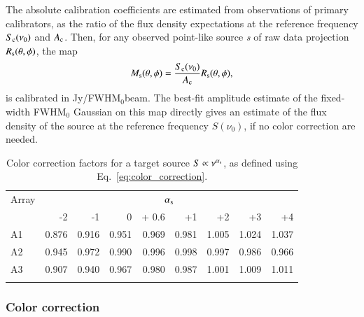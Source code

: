 The absolute calibration coefficients are estimated from observations
of primary calibrators, as the ratio of
the flux density expectations at the reference frequency
$S_{\rm{c}}(\nu_0)$ and $A_{\rm{c}}$. Then, for any observed point-like source
{\sl s} of raw data projection $R_{\rm{s}}(\theta,\phi)$, the map
\begin{equation}
  M_{\rm{s}}(\theta, \phi) = \frac{S_{\rm{c}} (\nu_{0})}{A_{\rm{c}}}
  R_{\rm{s}}(\theta,\phi),
  \label{eq:pointsourcephot}
\end{equation}
is calibrated in Jy/FWHM$_{0}$beam. {\lp The best-fit amplitude estimate
of the fixed-width FWHM$_{0}$ Gaussian on this map directly gives an
estimate of the flux density of the source at the reference
frequency $S(\nu_{0})$, if no color correction are needed.}

\begin{table}[!thbp]
\caption{Color correction factors for a target source  $S \propto \nu^{\alpha_{\rm{s}}}$, as defined using Eq.~\ref{eq:color_correction}.}
\label{tab:mod}
\centering 
\begin{tabular}{lrrrrrrrr}
\hline\hline
\noalign{\smallskip}
Array     & \multicolumn{8}{c}{$\alpha_{\rm{s}}$} \\
\noalign{\smallskip}
\hline
\noalign{\smallskip}
         &  -2 &  -1    &    0  & + 0.6 & +1  &  +2  & +3 & +4  \\       
\noalign{\smallskip}
\hline
\noalign{\smallskip}
          A1   & 0.876  &  0.916   &   0.951  & 0.969 &  0.981   &  1.005  &    1.024  &  1.037   \\
          A2   & 0.945  &  0.972   &   0.990  & 0.996 &  0.998   &  0.997  &    0.986  &  0.966      \\ 
          A3   & 0.907  &  0.940   &   0.967  & 0.980 &  0.987   &  1.001  &    1.009  &  1.011     \\
            \noalign{\smallskip}
            \hline
\end{tabular}
\end{table}

\subsubsection{Color correction}

